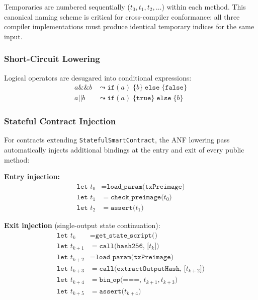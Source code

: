 \documentclass[11pt,a4paper]{article}
\begin{document}
Temporaries are numbered sequentially ($t_0, t_1, t_2, \ldots$) within each
method. This canonical naming scheme is critical for cross-compiler
conformance: all three compiler implementations must produce identical
temporary indices for the same input.

\subsubsection{Short-Circuit Lowering}

Logical operators are desugared into conditional expressions:
\begin{align}
  a \mathbin{\&\&} b &\leadsto \texttt{if}(a)\; \{b\}\; \texttt{else}\; \{\texttt{false}\} \\
  a \mathbin{||} b &\leadsto \texttt{if}(a)\; \{\texttt{true}\}\; \texttt{else}\; \{b\}
\end{align}

\subsubsection{Stateful Contract Injection}

For contracts extending \texttt{StatefulSmartContract}, the ANF lowering
pass automatically injects additional bindings at the entry and exit of
every public method:

\textbf{Entry injection:}
\begin{align*}
  \texttt{let } t_0 &= \texttt{load\_param(txPreimage)} \\
  \texttt{let } t_1 &= \texttt{check\_preimage(}t_0\texttt{)} \\
  \texttt{let } t_2 &= \texttt{assert(}t_1\texttt{)}
\end{align*}

\textbf{Exit injection} (single-output state continuation):
\begin{align*}
  \texttt{let } t_k &= \texttt{get\_state\_script()} \\
  \texttt{let } t_{k+1} &= \texttt{call(hash256, [}t_k\texttt{])} \\
  \texttt{let } t_{k+2} &= \texttt{load\_param(txPreimage)} \\
  \texttt{let } t_{k+3} &= \texttt{call(extractOutputHash, [}t_{k+2}\texttt{])} \\
  \texttt{let } t_{k+4} &= \texttt{bin\_op(===, }t_{k+1}, t_{k+3}\texttt{)}  \\
  \texttt{let } t_{k+5} &= \texttt{assert(}t_{k+4}\texttt{)}
\end{align*}
\end{document}
